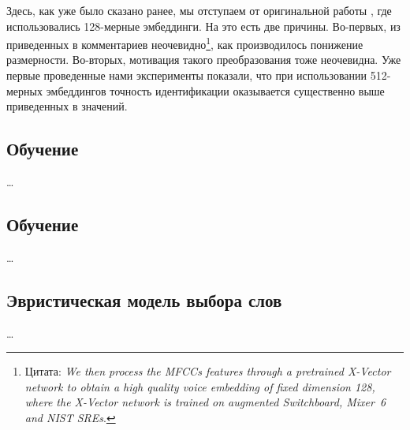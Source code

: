 Здесь, как уже было сказано ранее, мы отступаем от оригинальной работы
\cite{isrpaper}, где использовались 128-мерные эмбеддинги. На это есть две
причины. Во-первых, из приведенных в \cite{isrpaper} комментариев
неочевидно\footnote{
    Цитата: \textit{We then process the MFCCs features through a pretrained
    X-Vector network to obtain a high quality voice embedding of fixed dimension
    128, where the X-Vector network is trained on augmented Switchboard, Mixer~6
    and NIST SREs}.
}, как производилось понижение размерности.
Во-вторых, мотивация такого преобразования тоже неочевидна. Уже первые проведенные
нами эксперименты показали, что при использовании 512-мерных эмбеддингов точность
идентификации оказывается существенно выше приведенных в \cite{isrpaper} значений.

\subsection{Обучение \guesser{}}

\ldots

\subsection{Обучение \enquirer{}}

\ldots

\subsection{Эвристическая модель выбора слов}

\ldots